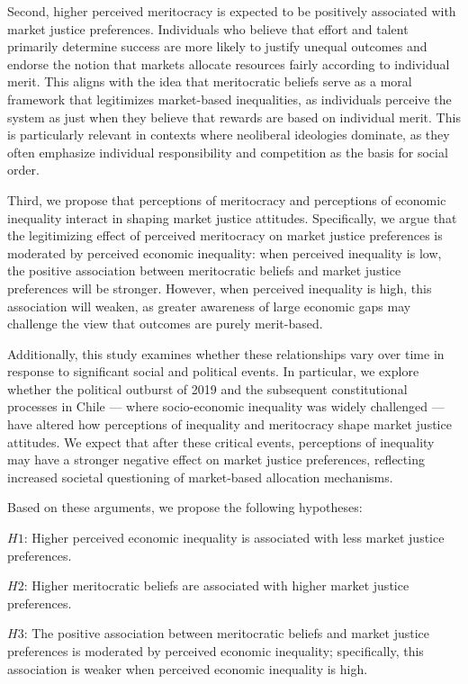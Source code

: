 \documentclass[
  12pt,
]{article}
\begin{document}
Second, higher perceived meritocracy is expected to be positively
associated with market justice preferences. Individuals who believe that
effort and talent primarily determine success are more likely to justify
unequal outcomes and endorse the notion that markets allocate resources
fairly according to individual merit. This aligns with the idea that
meritocratic beliefs serve as a moral framework that legitimizes
market-based inequalities, as individuals perceive the system as just
when they believe that rewards are based on individual merit. This is
particularly relevant in contexts where neoliberal ideologies dominate,
as they often emphasize individual responsibility and competition as the
basis for social order.

Third, we propose that perceptions of meritocracy and perceptions of
economic inequality interact in shaping market justice attitudes.
Specifically, we argue that the legitimizing effect of perceived
meritocracy on market justice preferences is moderated by perceived
economic inequality: when perceived inequality is low, the positive
association between meritocratic beliefs and market justice preferences
will be stronger. However, when perceived inequality is high, this
association will weaken, as greater awareness of large economic gaps may
challenge the view that outcomes are purely merit-based.

Additionally, this study examines whether these relationships vary over
time in response to significant social and political events. In
particular, we explore whether the political outburst of 2019 and the
subsequent constitutional processes in Chile --- where socio-economic
inequality was widely challenged --- have altered how perceptions of
inequality and meritocracy shape market justice attitudes. We expect
that after these critical events, perceptions of inequality may have a
stronger negative effect on market justice preferences, reflecting
increased societal questioning of market-based allocation mechanisms.

Based on these arguments, we propose the following hypotheses:

\(H1\): Higher perceived economic inequality is associated with less
market justice preferences.

\(H2\): Higher meritocratic beliefs are associated with higher market
justice preferences.

\(H3\): The positive association between meritocratic beliefs and market
justice preferences is moderated by perceived economic inequality;
specifically, this association is weaker when perceived economic
inequality is high.
\end{document}
